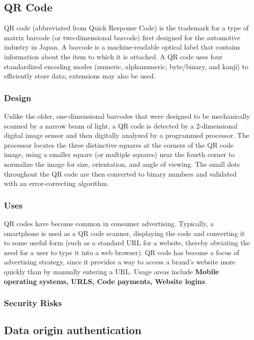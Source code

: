 \documentclass[12pt,journal,compsoc]{IEEEtran}
\begin{document}
\subsection{QR Code}
QR code (abbreviated from Quick Response Code) is the trademark for a type of matrix barcode (or two-dimensional barcode) first designed for the automotive industry in Japan. A barcode is a machine-readable optical label that contains information about the item to which it is attached. A QR code uses four standardized encoding modes (numeric, alphanumeric, byte/binary, and kanji) to efficiently store data; extensions may also be used.


\subsubsection{Design}

Unlike the older, one-dimensional barcodes that were designed to be mechanically scanned by a narrow beam of light, a QR code is detected by a 2-dimensional digital image sensor and then digitally analyzed by a programmed processor. The processor locates the three distinctive squares at the corners of the QR code image, using a smaller square (or multiple squares) near the fourth corner to normalize the image for size, orientation, and angle of viewing. The small dots throughout the QR code are then converted to binary numbers and validated with an error-correcting algorithm.


\subsubsection{Uses}

QR codes have become common in consumer advertising. Typically, a smartphone is used as a QR code scanner, displaying the code and converting it to some useful form (such as a standard URL for a website, thereby obviating the need for a user to type it into a web browser). QR code has become a focus of advertising strategy, since it provides a way to access a brand's website more quickly than by manually entering a URL. Usage areas include \textbf{Mobile operating systems, URLS, Code payments, Website logins}.

\subsubsection{Security Risks}




\subsection{Data origin authentication}
\end{document}
